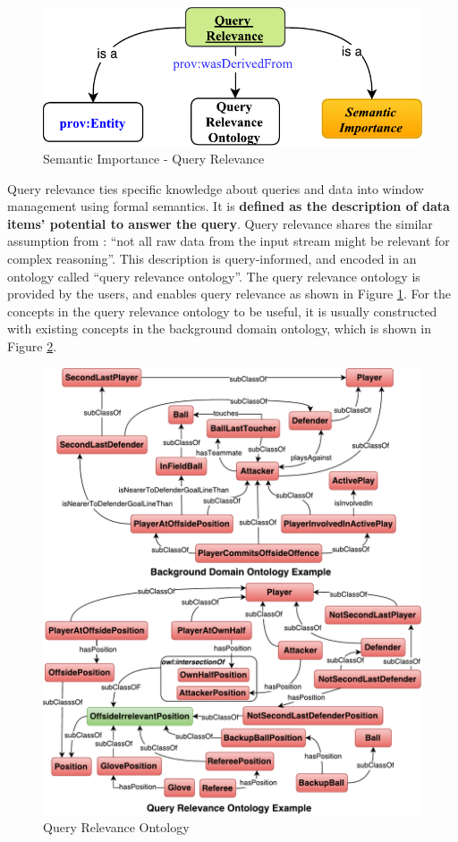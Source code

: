 \begin{figure}[!htbp]
	\centering
    \includegraphics[width=5in]{img/3-siqr.pdf}
    \caption{Semantic Importance - Query Relevance}
    \label{fig:3-siqr}
\end{figure}
Query relevance ties specific knowledge about queries and data into window management using formal semantics. 
It is \textbf{defined as the description of data items' potential to answer the query}.
Query relevance shares the similar assumption from \cite{mileo2013streamrule}: 
``not all raw data from the input stream might be relevant for complex reasoning''.
This description is query-informed, and encoded in an ontology called ``query relevance ontology''.
The query relevance ontology is provided by the users, and enables query relevance as shown in Figure \ref{fig:3-siqr}.
For the concepts in the query relevance ontology to be useful, it is usually constructed with existing concepts in the background domain ontology, which is shown in Figure \ref{fig:3-siqreo}.

\begin{figure}[!htbp]
	\centering
    \includegraphics[width=5in]{img/3-siqreo.pdf}
    \caption{Query Relevance Ontology}
    \label{fig:3-siqreo}
\end{figure}

